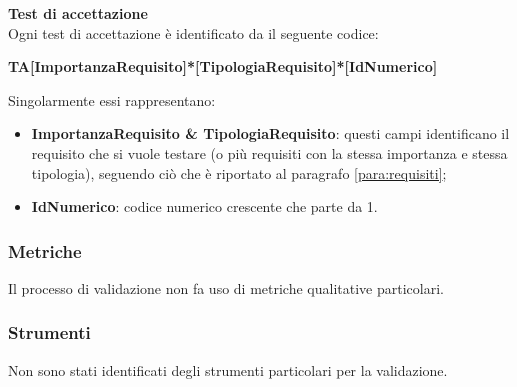 \mbox{}

\textbf{Test di accettazione}\\
Ogni test di accettazione è identificato da il seguente codice:
\begin{center}
\textbf{TA[ImportanzaRequisito]*[TipologiaRequisito]*[IdNumerico]} 
\end{center}
Singolarmente essi rappresentano:
\begin{itemize}
	\item \textbf{ImportanzaRequisito \& TipologiaRequisito}: questi campi identificano il requisito che si vuole testare (o più requisiti con la stessa importanza e stessa tipologia), seguendo ciò che è riportato al paragrafo \ref{para:requisiti};
	\item \textbf{IdNumerico}: codice numerico crescente che parte da 1.
\end{itemize}


\subsubsection{Metriche}
Il processo di validazione non fa uso di metriche qualitative particolari.

\subsubsection{Strumenti}
Non sono stati identificati degli strumenti particolari per la validazione.

